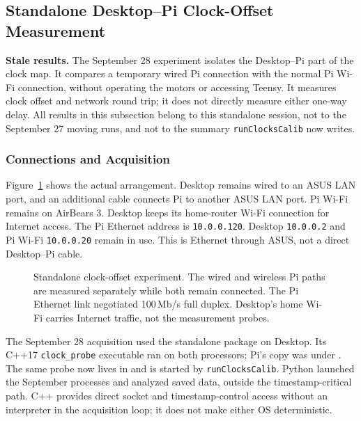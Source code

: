 \clearpage
\subsection{Standalone Desktop--Pi Clock-Offset Measurement}
\label{sec:standalone-desktop-pi}
\textbf{Stale results.} The September 28 experiment isolates the Desktop--Pi part of the clock map. It compares a temporary wired Pi connection with the normal Pi Wi-Fi connection, without operating the motors or accessing Teensy. It measures clock offset and network round trip; it does not directly measure either one-way delay. All results in this subsection belong to this standalone session, not to the September 27 moving runs, and not to the summary \texttt{runClocksCalib} now writes.

\subsubsection{Connections and Acquisition}
Figure~\ref{fig:desktop-pi-clock-network} shows the actual arrangement. Desktop remains wired to an ASUS LAN port, and an additional cable connects Pi to another ASUS LAN port. Pi Wi-Fi remains on AirBears 3. Desktop keeps its home-router Wi-Fi connection for Internet access. The Pi Ethernet address is \texttt{10.0.0.120}. Desktop \texttt{10.0.0.2} and Pi Wi-Fi \texttt{10.0.0.20} remain in use. This is Ethernet through ASUS, not a direct Desktop--Pi cable.

\begin{figure}[H]
\centering

\caption{Standalone clock-offset experiment. The wired and wireless Pi paths are measured separately while both remain connected. The Pi Ethernet link negotiated 100\,Mb/s full duplex. Desktop's home Wi-Fi carries Internet traffic, not the measurement probes.}
\label{fig:desktop-pi-clock-network}
\end{figure}

The September 28 acquisition used the standalone package  on Desktop. Its C++17 \texttt{clock\_probe} executable ran on both processors; Pi's copy was under . The same probe now lives in  and is started by \texttt{runClocksCalib}. Python launched the September processes and analyzed saved data, outside the timestamp-critical path. C++ provides direct socket and timestamp-control access without an interpreter in the acquisition loop; it does not make either OS deterministic.

